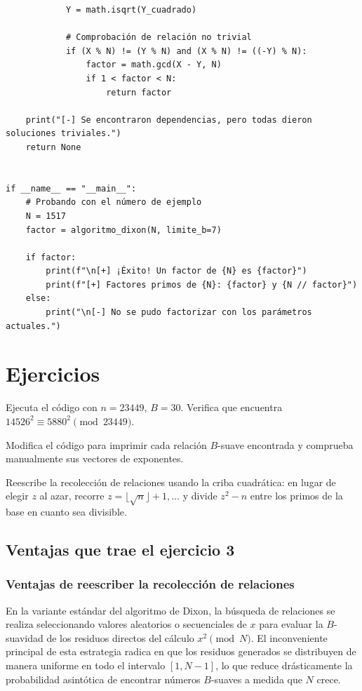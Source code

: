\begin{verbatim}
            Y = math.isqrt(Y_cuadrado)

            # Comprobación de relación no trivial
            if (X % N) != (Y % N) and (X % N) != ((-Y) % N):
                factor = math.gcd(X - Y, N)
                if 1 < factor < N:
                    return factor

    print("[-] Se encontraron dependencias, pero todas dieron soluciones triviales.")
    return None


if __name__ == "__main__":
    # Probando con el número de ejemplo
    N = 1517
    factor = algoritmo_dixon(N, limite_b=7)

    if factor:
        print(f"\n[+] ¡Éxito! Un factor de {N} es {factor}")
        print(f"[+] Factores primos de {N}: {factor} y {N // factor}")
    else:
        print("\n[-] No se pudo factorizar con los parámetros actuales.")

\end{verbatim}

\section{Ejercicios}

\begin{ejer}
Ejecuta el código con $n = 23449$, $B = 30$. Verifica que encuentra
$14526^2 \equiv 5880^2 \pmod{23449}$.
\end{ejer}

\begin{ejer}
Modifica el código para imprimir cada relación $B$-suave encontrada
y comprueba manualmente sus vectores de exponentes.
\end{ejer}

\begin{ejer}
Reescribe la recolección de relaciones usando la
criba cuadrática: en lugar de elegir $z$ al azar, recorre
$z = \lfloor\sqrt{n}\rfloor + 1, \dots$ y divide $z^2 - n$ entre los
primos de la base en cuanto sea divisible.
\end{ejer}

\subsection*{Ventajas que trae el ejercicio 3}
\subsubsection*{Ventajas de reescriber la recolección de relaciones}
En la variante estándar del algoritmo de Dixon, la búsqueda de relaciones se realiza seleccionando valores aleatorios o secuenciales de $x$ para evaluar la $B$-suavidad de los residuos directos del cálculo $x^2 \pmod{N}$. El inconveniente principal de esta estrategia radica en que los residuos generados se distribuyen de manera uniforme en todo el intervalo $[1, N-1]$, lo que reduce drásticamente la probabilidad asintótica de encontrar números $B$-suaves a medida que $N$ crece.

